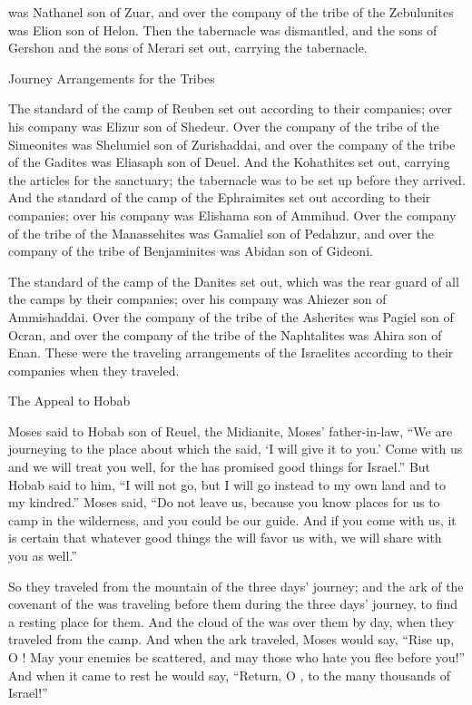 {was Nathanel
son
of Zuar,
and over
the company
of the tribe
of the Zebulunites
was Elion
son
of Helon.
Then
the tabernacle
was
dismantled,
and the sons
of Gershon
and the sons
of Merari
set out,
carrying
the tabernacle.
\par }{\SH Journey Arrangements for the Tribes
\par }{\PP {}The standard
of the camp
of Reuben
set out according to their companies;
over
his company
was Elizur
son
of Shedeur.
Over
the company
of the tribe
of the Simeonites
was Shelumiel
son
of Zurishaddai,
and over
the company
of the tribe
of the Gadites
was Eliasaph
son
of Deuel.
And the Kohathites
set out,
carrying
the articles
for the sanctuary;
the
tabernacle
was to be set up
before
they arrived.
And the standard
of the camp
of the Ephraimites
set out
according to their companies;
over
his company
was Elishama
son
of Ammihud.
Over
the company
of the tribe
of the Manassehites
was Gamaliel
son
of Pedahzur,
and over
the company
of the tribe
of Benjaminites
was Abidan
son
of Gideoni.
\par }{\PP {}The standard
of the camp
of the Danites
set out,
which was the rear guard
of all
the camps
by their companies;
over
his company
was Ahiezer
son
of Ammishaddai.
Over
the company
of the tribe
of the Asherites
was Pagiel
son
of Ocran,
and over
the company
of the tribe
of the Naphtalites
was Ahira
son
of Enan.
These
were the traveling arrangements
of the Israelites
according to their companies
when they traveled.
\par }{\SH The Appeal to Hobab
\par }{\PP {}Moses
said
to Hobab
son
of Reuel,
the Midianite,
Moses’
father-in-law, “We
are journeying
to
the place
about which
the {}
said,
‘I will give
it to you.’ Come
with
us and we will treat you well,
for
the {}
has promised
good
things for Israel.”
But Hobab said
to him,
“I will not
go,
but I will go
instead
to
my own land
and to
my kindred.”
Moses said,
“Do not
leave
us, because
you know
places
for us to camp
in the wilderness,
and you could be
our guide.
And if
you come
with
us, it is
certain that whatever
good
things the
{}
will favor us with, we will share with
you as well.”
\par }{\PP {}So they traveled
from the mountain
of the {}
three
days’
journey;
and the ark
of the covenant
of the {}
was traveling
before
them during the three
days’
journey,
to find
a resting place for them.
And the cloud
of the {}
was over
them by day,
when they traveled
from
the camp.
And when the ark
traveled,
Moses
would say,
“Rise
up, O
{}! May your enemies
be scattered,
and may those who hate
you flee
before you!”
And when it came to rest
he would say,
“Return,
O
{}, to the many thousands
of Israel!”


}
